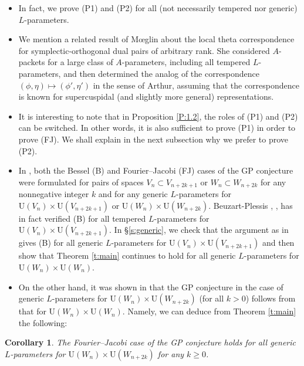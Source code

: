 \documentclass[11pt]{amsart}
\numberwithin{equation}{section}
\theoremstyle{plain}
\newtheorem{cor}[thm]{Corollary}
\theoremstyle{definition}
\theoremstyle{remark}
\def\U{\mathrm{U}}
\begin{document}
\begin{itemize}
\item
In fact, we prove (P1) and (P2) for all (not necessarily tempered nor generic) $L$-parameters.

\item
We mention a related result of M{\oe}glin \cite{m} about the local theta correspondence for symplectic-orthogonal dual pairs of arbitrary rank.
She considered $A$-packets for a large class of $A$-parameters, including all tempered $L$-parameters,
and then determined the analog of the correspondence $(\phi, \eta) \mapsto (\phi', \eta')$ in the sense of Arthur,
assuming that the correspondence is known for supercuspidal (and slightly more general) representations.

\item 
It is interesting to note that in Proposition \ref{P:1.2}, the roles of (P1) and (P2) can be switched. In other words, it is also sufficient to prove (P1) in order to prove (FJ). We shall explain in the next subsection why we prefer to prove (P2). 

\item
In \cite{ggp1}, both the Bessel (B) and Fourier--Jacobi (FJ) cases of the GP conjecture were formulated for pairs of spaces $V_n \subset V_{n+2k+1}$ or $W_n \subset W_{n+2k}$ for any nonnegative integer $k$ and for any generic $L$-parameters for $\U(V_n) \times \U(V_{n+2k+1})$ or $\U(W_n) \times \U(W_{n+2k})$.
Beuzart-Plessis \cite{bp1}, \cite{bp2}, \cite{bp3} has in fact verified (B) for all tempered $L$-parameters for $\U(V_n) \times \U(V_{n+2k+1})$.
In \S \ref{s:generic}, we check that the argument as in \cite{mw} gives (B) for all generic $L$-parameters for $\U(V_n) \times \U(V_{n+2k+1})$ and then show that Theorem \ref{t:main} continues to hold for all generic $L$-parameters for $\U(W_n) \times \U(W_n)$.

\item
On the other hand, it was shown in \cite[Theorem 19.1]{ggp1} that the GP conjecture in the case of generic $L$-parameters for $\U(W_n) \times \U(W_{n+2k})$ (for all $k>0$) follows from that for $\U(W_n) \times \U(W_n)$.
Namely, we can deduce from Theorem \ref{t:main} the following:
\end{itemize}

\begin{cor}
The Fourier--Jacobi case of the GP conjecture holds for all generic $L$-parameters for $\U(W_n) \times \U(W_{n+2k})$ for any $k \ge 0$.
\end{cor}
\end{document}
